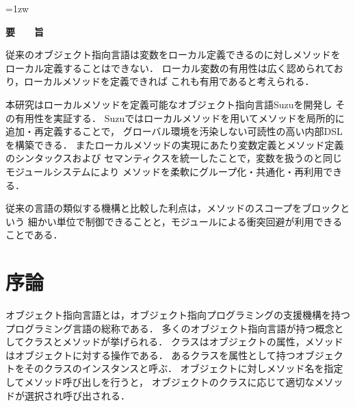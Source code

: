 \documentclass[a4paper,11pt,dvipdfmx]{jreport}
\title{\Underline{レキシカル環境にメソッドを定義する\\オブジェクト指向言語Suzu}}
\author{林 拓人}
\begin{document}
\maketitle
\thispagestyle{empty}
\newpage

\thispagestyle{empty}
\vspace*{20pt plus 1fil}
\parindent=1zw
\noindent
\begin{center}
{\Large \bf 要　　旨}
\vspace{2cm}
\end{center}

従来のオブジェクト指向言語は変数をローカル定義できるのに対しメソッドを
ローカル定義することはできない．
ローカル変数の有用性は広く認められており，ローカルメソッドを定義できれば
これも有用であると考えられる．

本研究はローカルメソッドを定義可能なオブジェクト指向言語Suzuを開発し
その有用性を実証する．
Suzuではローカルメソッドを用いてメソッドを局所的に追加・再定義することで，
グローバル環境を汚染しない可読性の高い内部DSLを構築できる．
またローカルメソッドの実現にあたり変数定義とメソッド定義のシンタックスおよび
セマンティクスを統一したことで，変数を扱うのと同じモジュールシステムにより
メソッドを柔軟にグループ化・共通化・再利用できる．

従来の言語の類似する機構と比較した利点は，メソッドのスコープをブロックという
細かい単位で制御できることと，モジュールによる衝突回避が利用できることである．

\par
\vspace{0pt plus 1fil}
\newpage

\tableofcontents

\pagebreak \setcounter{page}{1}


\chapter{序論}

オブジェクト指向言語とは，オブジェクト指向プログラミングの支援機構を持つ
プログラミング言語の総称である．
多くのオブジェクト指向言語が持つ概念としてクラスとメソッドが挙げられる．
クラスはオブジェクトの属性，メソッドはオブジェクトに対する操作である．
あるクラスを属性として持つオブジェクトをそのクラスのインスタンスと呼ぶ．
オブジェクトに対しメソッド名を指定してメソッド呼び出しを行うと，
オブジェクトのクラスに応じて適切なメソッドが選択され呼び出される．
\end{document}
